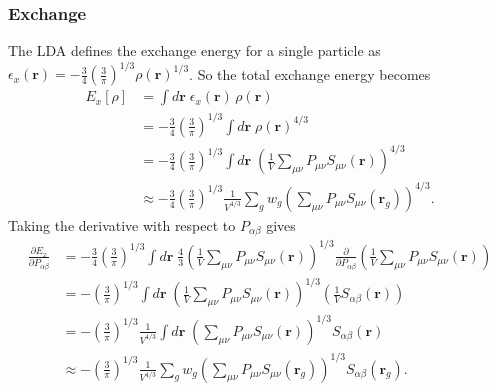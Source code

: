 \subsubsection{Exchange}
The LDA defines the exchange energy for a single particle as $\epsilon_x(\mathbf r) = -\frac{3}{4}\left(\frac{3}{\pi}\right)^{1/3} \rho(\mathbf r)^{1/3}$. So the total exchange energy becomes 
\begin{align}
  E_x[\rho]
  &= \int d\mathbf r\; \epsilon_x(\mathbf r)\,\rho(\mathbf r) \\
  &= -\frac{3}{4}\left(\frac{3}{\pi}\right)^{1/3} \int d\mathbf r\; \rho(\mathbf r)^{4/3} \\
  &= -\frac{3}{4}\left(\frac{3}{\pi}\right)^{1/3} \int d\mathbf r\;
     \left(
       \frac{1}{V}\sum_{\mu\nu}P_{\mu\nu}S_{\mu\nu}(\mathbf r)
     \right)^{4/3} \\
&\approx -\frac{3}{4}\left(\frac{3}{\pi}\right)^{1/3} \frac{1}{V^{4/3}} \sum_g w_g
      \left(
        \sum_{\mu\nu}P_{\mu\nu}S_{\mu\nu}(\mathbf r_g)
      \right)^{4/3}.
\end{align}
Taking the derivative with respect to $P_{\alpha\beta}$ gives
\begin{align}
  \frac{\partial E_x}{\partial P_{\alpha\beta}}
&= -\frac{3}{4}\left(\frac{3}{\pi}\right)^{1/3} \int d\mathbf r\;
     \frac{4}{3}
     \left(
       \frac{1}{V}\sum_{\mu\nu}P_{\mu\nu}S_{\mu\nu}(\mathbf r)
     \right)^{1/3}
     \frac{\partial}{\partial P_{\alpha\beta}}
     \left(
       \frac{1}{V}\sum_{\mu\nu}P_{\mu\nu}S_{\mu\nu}(\mathbf r)
     \right) \\
   &= -\left(\frac{3}{\pi}\right)^{1/3} \int d\mathbf r\;
      \left(
        \frac{1}{V}\sum_{\mu\nu}P_{\mu\nu}S_{\mu\nu}(\mathbf r)
      \right)^{1/3}
      \left(
        \frac{1}{V} S_{\alpha\beta}(\mathbf r)
      \right) \\
   &= -\left(\frac{3}{\pi}\right)^{1/3} \frac{1}{V^{4/3}} \int d\mathbf r\;
      \left(
        \sum_{\mu\nu}P_{\mu\nu}S_{\mu\nu}(\mathbf r)
      \right)^{1/3}
      S_{\alpha\beta}(\mathbf r) \\
&\approx -\left(\frac{3}{\pi}\right)^{1/3} \frac{1}{V^{4/3}} \sum_g w_g
      \left(
        \sum_{\mu\nu}P_{\mu\nu}S_{\mu\nu}(\mathbf r_g)
      \right)^{1/3}
      S_{\alpha\beta}(\mathbf r_g).
\end{align}

